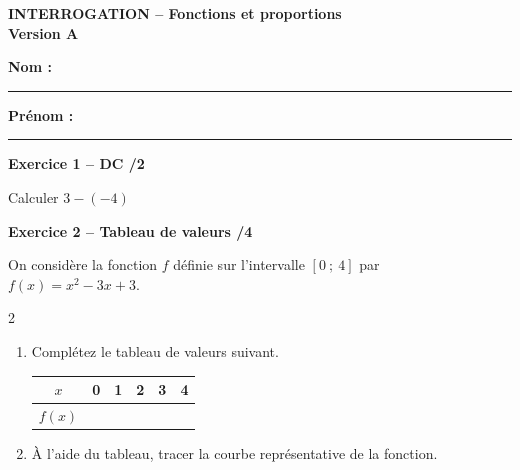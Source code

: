 \documentclass[10pt,a4paper]{article}
\newcommand{\version}[1]{
    \begin{center}
        \textbf{\large INTERROGATION -- Fonctions et proportions}\\
        \textbf{Version #1}
    \end{center}

    \vspace{-0.1cm}

    \textbf{Nom :} \rule{5cm}{0.4pt}
    \hfill
    \textbf{Prénom :} \rule{4cm}{0.4pt}

    \vspace{0.2cm}
}
\begin{document}

\version{A}

\textbf{Exercice 1 -- DC \hfill /2}

Calculer $3-(-4)$

\vspace{0.1cm}

\textbf{Exercice 2 -- Tableau de valeurs \hfill /4}

On considère la fonction \(f\) définie sur l'intervalle \([0\ ;\ 4]\) par \(f(x)=x^2-3x+3\). 


\begin{multicols}{2}
    \begin{minipage}{0.45\textwidth}
    \begin{enumerate}
    \item Complétez le tableau de valeurs suivant.
    
    \begin{center}
        \renewcommand{\arraystretch}{1.5} %
        \setlength{\tabcolsep}{0.3cm} %
        \begin{tabular}{|*{6}{c|}}
        \hline
        \(x\) & 0 & 1 & 2 & 3 & 4  \\
        \hline
        \(f(x)\) &  &  &  &  &  \\
        \hline
        \end{tabular}
    \end{center}

    \vfill\null
    
    \item À l'aide du tableau, tracer la courbe représentative de la fonction.
    \end{enumerate}
    \end{minipage}

        \hspace{-1cm}

\end{multicols}
\end{document}
